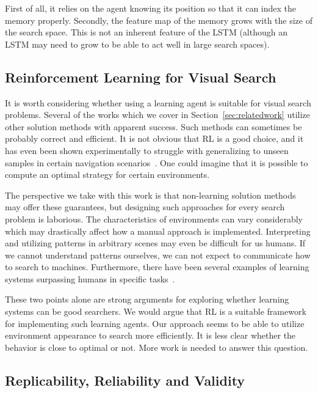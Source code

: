 First of all, it relies on the agent knowing its position so that it can index the memory properly.
Secondly, the feature map of the memory grows with the size of the search space.
This is not an inherent feature of the LSTM (although an LSTM may need to grow to be able to act well in large search spaces).


\subsection{Reinforcement Learning for Visual Search}

It is worth considering whether using a learning agent is suitable for visual search problems.
Several of the works which we cover in Section~\ref{sec:relatedwork} utilize other solution methods with apparent success.
Such methods can sometimes be probably correct and efficient.
It is not obvious that RL is a good choice, and it has even been shown experimentally to struggle with generalizing to unseen samples in certain navigation scenarios~\cite{dhiman_critical_2019}.
One could imagine that it is possible to compute an optimal strategy for certain environments.

The perspective we take with this work is that non-learning solution methods may offer these guarantees, but designing such approaches for every search problem is laborious.
The characteristics of environments can vary considerably which may drastically affect how a manual approach is implemented.
Interpreting and utilizing patterns in arbitrary scenes may even be difficult for us humans.
If we cannot understand patterns ourselves, we can not expect to communicate how to search to machines.
Furthermore, there have been several examples of learning systems surpassing humans in specific tasks~\cite{silver_mastering_2016,vinyals_grandmaster_2019}.

These two points alone are strong arguments for exploring whether learning systems can be good searchers.
We would argue that RL is a suitable framework for implementing such learning agents.
Our approach seems to be able to utilize environment appearance to search more efficiently.
It is less clear whether the behavior is close to optimal or not.
More work is needed to answer this question.

\subsection{Replicability, Reliability and Validity}

